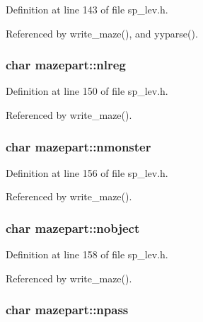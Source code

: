 Definition at line 143 of file sp\+\_\+lev.\+h.



Referenced by write\+\_\+maze(), and yyparse().

\hypertarget{structmazepart_a2599d1a1147830cd8eeb93a7e8e43baa}{
\subsubsection[{nlreg}]{\setlength{\rightskip}{0pt plus 5cm}char mazepart\+::nlreg}}\label{structmazepart_a2599d1a1147830cd8eeb93a7e8e43baa}


Definition at line 150 of file sp\+\_\+lev.\+h.



Referenced by write\+\_\+maze().

\hypertarget{structmazepart_a149c4e4689c3764690892f4296ad95c0}{
\subsubsection[{nmonster}]{\setlength{\rightskip}{0pt plus 5cm}char mazepart\+::nmonster}}\label{structmazepart_a149c4e4689c3764690892f4296ad95c0}


Definition at line 156 of file sp\+\_\+lev.\+h.



Referenced by write\+\_\+maze().

\hypertarget{structmazepart_ade304a786902ad6a462fb3cf1322189d}{
\subsubsection[{nobject}]{\setlength{\rightskip}{0pt plus 5cm}char mazepart\+::nobject}}\label{structmazepart_ade304a786902ad6a462fb3cf1322189d}


Definition at line 158 of file sp\+\_\+lev.\+h.



Referenced by write\+\_\+maze().

\hypertarget{structmazepart_a7726969c512cd8258ec4649c034e44f6}{
\subsubsection[{npass}]{\setlength{\rightskip}{0pt plus 5cm}char mazepart\+::npass}}\label{structmazepart_a7726969c512cd8258ec4649c034e44f6}



